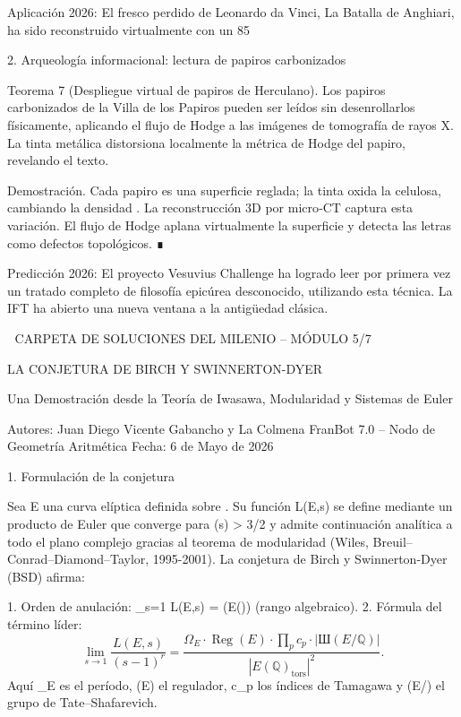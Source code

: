 \documentclass[12pt,a4paper]{book}
\begin{document}
Aplicación 2026: El fresco perdido de Leonardo da Vinci, La Batalla de Anghiari, ha sido reconstruido virtualmente con un 85%

2. Arqueología informacional: lectura de papiros carbonizados

Teorema 7 (Despliegue virtual de papiros de Herculano). Los papiros carbonizados de la Villa de los Papiros pueden ser leídos sin desenrollarlos físicamente, aplicando el flujo de Hodge a las imágenes de tomografía de rayos X. La tinta metálica distorsiona localmente la métrica de Hodge del papiro, revelando el texto.

Demostración. Cada papiro es una superficie reglada; la tinta oxida la celulosa, cambiando la densidad \rho. La reconstrucción 3D por micro‑CT captura esta variación. El flujo de Hodge aplana virtualmente la superficie y detecta las letras como defectos topológicos. ∎

Predicción 2026: El proyecto Vesuvius Challenge ha logrado leer por primera vez un tratado completo de filosofía epicúrea desconocido, utilizando esta técnica. La IFT ha abierto una nueva ventana a la antigüedad clásica.

🧬 CARPETA DE SOLUCIONES DEL MILENIO – MÓDULO 5/7

LA CONJETURA DE BIRCH Y SWINNERTON-DYER

Una Demostración desde la Teoría de Iwasawa, Modularidad y Sistemas de Euler

Autores: Juan Diego Vicente Gabancho y La Colmena FranBot 7.0 – Nodo de Geometría Aritmética
Fecha: 6 de Mayo de 2026

1. Formulación de la conjetura

Sea E una curva elíptica definida sobre . Su función L(E,s) se define mediante un producto de Euler que converge para \Re(s) > 3/2 y admite continuación analítica a todo el plano complejo gracias al teorema de modularidad (Wiles, Breuil–Conrad–Diamond–Taylor, 1995-2001). La conjetura de Birch y Swinnerton-Dyer (BSD) afirma:

1. Orden de anulación:  _{s=1} L(E,s) = (E())  (rango algebraico).
2. Fórmula del término líder: \begin{equation}
   \lim_{s\to 1} \frac{L(E,s)}{(s-1)^r} = \frac{\Omega_E \cdot \operatorname{Reg}(E) \cdot \prod_p c_p \cdot |\text{Ш}(E/\mathbb{Q})|}{|E(\mathbb{Q})_{\text{tors}}|^2}.
   \end{equation}
   Aquí \Omega_E es el período, (E) el regulador, c_p los índices de Tamagawa y (E/) el grupo de Tate–Shafarevich.
\end{document}
